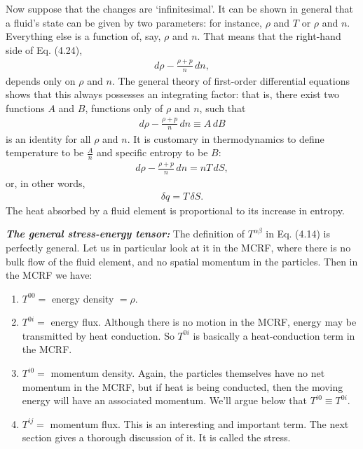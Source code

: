 \documentclass[11pt,letterpaper]{book}
\begin{document}
    Now suppose that the changes are ‘infinitesimal’. It can be shown in general that a fluid’s state can be given by two parameters: for instance, \(\rho\) and \(T\) or \(\rho\) and \(n\). Everything else is a function of, say, \(\rho\) and \(n\). That means that the right-hand side of Eq. (4.24),
    \begin{align}
    d\rho - \frac{\rho + p}{n} \, dn,
    \end{align}
    depends only on \(\rho\) and \(n\). The general theory of first-order differential equations shows that this always possesses an integrating factor: that is, there exist two functions \(A\) and \(B\), functions only of \(\rho\) and \(n\), such that
    \begin{align}
    d\rho - \frac{\rho + p}{n} \, dn \equiv A \, dB
    \end{align}
    is an identity for all \(\rho\) and \(n\). It is customary in thermodynamics to define temperature to be \( \frac{A}{n} \) and specific entropy to be \( B \):
    \begin{align}
    d\rho - \frac{\rho + p}{n} \, dn = nT \, dS, \tag{4.25}
    \end{align}
    or, in other words,
    \begin{align}
    \delta q = T \, \delta S. \tag{4.26}
    \end{align}
    The heat absorbed by a fluid element is proportional to its increase in entropy.

    \textbf{\textit{The general stress-energy tensor:}}
    The definition of \(T^{\alpha\beta}\) in Eq. (4.14) is perfectly general. Let us in particular look at it in the MCRF, where there is no bulk flow of the fluid element, and no spatial momentum in the particles. Then in the MCRF we have:

    \begin{enumerate}
        \item \(T^{00} = \) energy density \(= \rho\).
        \item \(T^{0i} = \) energy flux. Although there is no motion in the MCRF, energy may be transmitted by heat conduction. So \(T^{0i}\) is basically a heat-conduction term in the MCRF.
        \item \(T^{i0} = \) momentum density. Again, the particles themselves have no net momentum in the MCRF, but if heat is being conducted, then the moving energy will have an associated momentum. We’ll argue below that \(T^{i0} \equiv T^{0i}\).
        \item \(T^{ij} = \) momentum flux. This is an interesting and important term. The next section gives a thorough discussion of it. It is called the stress.
    \end{enumerate}
\end{document}
